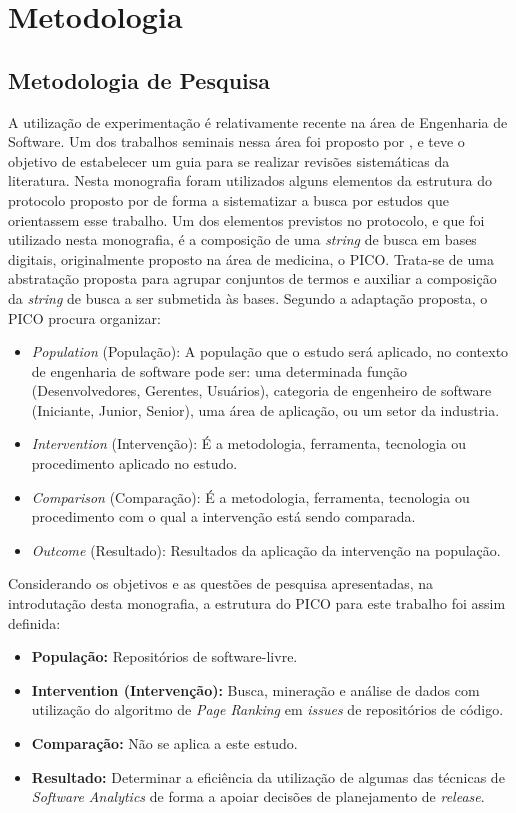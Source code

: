 \chapter{Metodologia}
\label{met}
\section{Metodologia de Pesquisa}
\label{met:pes}

A utilização de experimentação é relativamente recente na área de Engenharia de Software. Um dos trabalhos seminais nessa área foi proposto por , e teve o objetivo de estabelecer um guia para se realizar revisões sistemáticas da literatura. Nesta monografia foram utilizados alguns elementos da estrutura do protocolo proposto por  de forma a sistematizar a busca por estudos que orientassem esse trabalho. Um dos elementos previstos no protocolo, e que foi utilizado nesta monografia, é a composição de uma \textit{string} de busca em bases digitais, originalmente proposto na área de medicina, o PICO. \cite{citeulike:10757239} Trata-se de uma abstratação proposta para agrupar conjuntos de termos e auxiliar a composição da \textit{string} de busca a ser submetida às bases. Segundo a adaptação proposta, o PICO procura organizar:

\begin{itemize}
    \item \textit{Population} (População): A população que o estudo será aplicado, no contexto de engenharia de software pode ser: uma determinada função (Desenvolvedores, Gerentes, Usuários), categoria de engenheiro de software (Iniciante, Junior, Senior), uma área de aplicação, ou um setor da industria.
    \item \textit{Intervention} (Intervenção): É a metodologia, ferramenta, tecnologia ou procedimento aplicado no estudo.
    \item \textit{Comparison} (Comparação): É a metodologia, ferramenta, tecnologia ou procedimento com o qual a intervenção está sendo comparada.
    \item \textit{Outcome} (Resultado): Resultados da aplicação da intervenção na população.
\end{itemize}

Considerando os objetivos e as questões de pesquisa apresentadas, na introdutação desta monografia, a estrutura do PICO para este trabalho foi assim definida:

\begin{itemize}
    \item \textbf{População:} Repositórios de software-livre.
    \item \textbf{Intervention (Intervenção):} Busca, mineração e análise de dados com utilização do algoritmo de \textit{Page Ranking} em \textit{issues} de repositórios de código.
    \item \textbf{Comparação:} Não se aplica a este estudo.
    \item \textbf{Resultado:} Determinar a eficiência da utilização de algumas das técnicas de \textit{Software Analytics} de forma a apoiar decisões de planejamento de \textit{release}.
\end{itemize}



